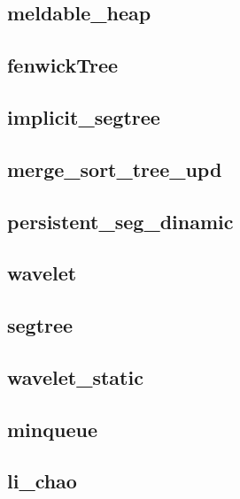 \subsection{meldable_heap}
\raggedbottom
\hrulefill
\subsection{fenwickTree}
\raggedbottom
\hrulefill
\subsection{implicit_segtree}
\raggedbottom
\hrulefill
\subsection{merge_sort_tree_upd}
\raggedbottom
\hrulefill
\subsection{persistent_seg_dinamic}
\raggedbottom
\hrulefill
\subsection{wavelet}
\raggedbottom
\hrulefill
\subsection{segtree}
\raggedbottom
\hrulefill
\subsection{wavelet_static}
\raggedbottom
\hrulefill
\subsection{minqueue}
\raggedbottom
\hrulefill
\subsection{li_chao}
\raggedbottom
\hrulefill
